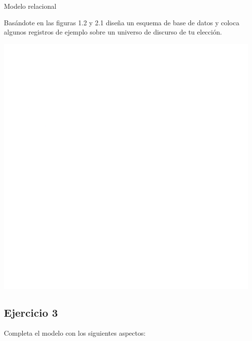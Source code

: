 \documentclass[a4paper,12pt]{article}
\begin{document}
Modelo relacional

\textcolor{sun}{Basándote en las figuras 1.2 y 2.1 diseña un esquema de base de datos y coloca algunos
registros de ejemplo sobre un universo de discurso de tu elección.}

\begin{center}
    \includegraphics[scale = .6]{ejercico02.png}
\end{center}



\subsection*{Ejercicio 3}

Completa el modelo con los siguientes aspectos:
\end{document}
